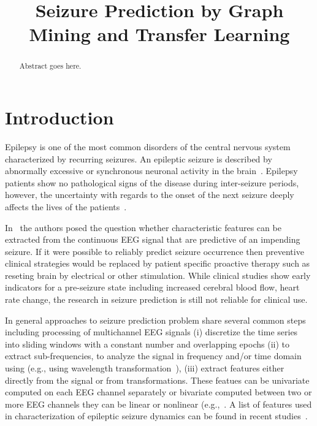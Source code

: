 \documentclass{article} %
\title{Seizure Prediction by Graph Mining and Transfer Learning}
\author{
}
\begin{document}
\maketitle

\begin{abstract}
Abstract goes here.  
\end{abstract}

\section{Introduction}
Epilepsy is one of the most common disorders of the central nervous system characterized by recurring seizures.  An epileptic seizure is described by abnormally excessive or synchronous neuronal activity in the brain~\cite{seizure_def}.  Epilepsy patients show no pathological signs of the disease during inter-seizure periods, however, the uncertainty with regards to the onset of the next seizure deeply affects the lives of the patients~\cite{fisher_impact_epilepsy}.  

In~\cite{mormann_seizure_prediction} the authors posed the question whether characteristic features can be extracted from the continuous EEG signal that are predictive of an impending seizure.  If it were possible to reliably predict seizure occurrence then preventive clinical strategies would be replaced by patient specific proactive therapy such as reseting brain by electrical or other stimulation.  While clinical studies show early indicators for a pre-seizure state including increased cerebral blood flow, heart rate change, the research in seizure prediction is still not reliable for clinical use.

In general approaches to seizure prediction problem share several common steps including processing of multichannel EEG signals (i) discretize the time series into sliding windows with a constant number and overlapping epochs (ii) to extract sub-frequencies, to analyze the signal in frequency and/or time domain using (e.g., using wavelength transformation~\cite{acar_seizure_localization}), (iii) extract features either directly from the signal or from transformations.  These featues can be univariate computed on each EEG channel separately or bivariate computed  between two or more EEG channels they can be linear or nonlinear (e.g.,~\cite{mormann2005predictability}.  A list of features used in characterization of epileptic seizure dynamics can be found in recent studies~\cite{paivinen2005epileptic,mormann2005predictability,van2005detecting}.
\end{document}
